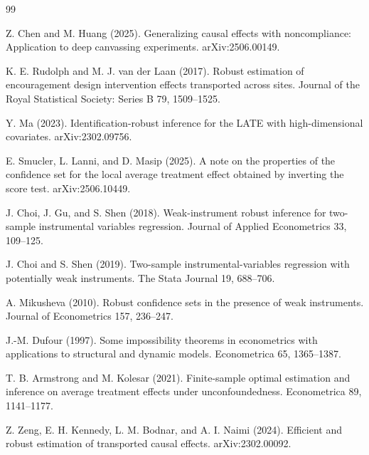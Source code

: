 \documentclass{article}
\begin{document}
\begin{thebibliography}{99}

   Z. Chen and M. Huang (2025). Generalizing causal effects with noncompliance: Application to deep canvassing experiments. arXiv:2506.00149.

   K. E. Rudolph and M. J. van der Laan (2017). Robust estimation of encouragement design intervention effects transported across sites. Journal of the Royal Statistical Society: Series B 79, 1509--1525.

   Y. Ma (2023). Identification-robust inference for the LATE with high-dimensional covariates. arXiv:2302.09756.

   E. Smucler, L. Lanni, and D. Masip (2025). A note on the properties of the confidence set for the local average treatment effect obtained by inverting the score test. arXiv:2506.10449.

   J. Choi, J. Gu, and S. Shen (2018). Weak-instrument robust inference for two-sample instrumental variables regression. Journal of Applied Econometrics 33, 109--125.

   J. Choi and S. Shen (2019). Two-sample instrumental-variables regression with potentially weak instruments. The Stata Journal 19, 688--706.

   A. Mikusheva (2010). Robust confidence sets in the presence of weak instruments. Journal of Econometrics 157, 236--247.

   J.-M. Dufour (1997). Some impossibility theorems in econometrics with applications to structural and dynamic models. Econometrica 65, 1365--1387.

   T. B. Armstrong and M. Kolesar (2021). Finite-sample optimal estimation and inference on average treatment effects under unconfoundedness. Econometrica 89, 1141--1177.

   Z. Zeng, E. H. Kennedy, L. M. Bodnar, and A. I. Naimi (2024). Efficient and robust estimation of transported causal effects. arXiv:2302.00092.

\end{thebibliography}
\end{document}
